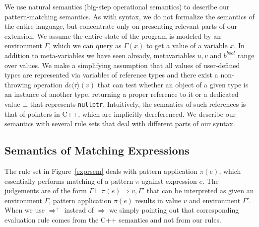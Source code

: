 \documentclass[preprint]{sigplanconf}
\makeatletter
\DeclareRobustCommand{\code}[1]{{\lstinline[breaklines=false,escapechar=@]{#1}}}
\newcommand{\evals}{\Rightarrow}
\newcommand{\evalspp}{\Rightarrow^+}
\newcommand{\DynCast}[2]{\ensuremath{dc\langle{#1}\rangle({#2})}}
\newcommand{\nullptr}{\ensuremath{\bot}}
\makeatother
\begin{document}
We use natural semantics\cite{Kahn87} (big-step operational semantics) to 
describe our pattern-matching semantics. As with syntax, we do not formalize the 
semantics of the entire language, but concentrate only on presenting relevant 
parts of our extension. We assume the entire state of the program is modeled by 
an environment $\Gamma$, which we can query as $\Gamma(x)$ to get a value of a 
variable $x$. In addition to meta-variables we have seen already, metavariables 
$u,v$ and $b^{bool}$ range over values. We make a simplifying assumption that 
all values of user-defined types are represented via variables of reference 
types and there exist a non-throwing operation \DynCast{\tau}{v} that can test 
whether an object of a given type is an instance of another type, returning a 
proper reference to it or a dedicated value \nullptr{} that represents 
\code{nullptr}. Intuitively, the semantics of such references is that of 
pointers in C++, which are implicitly dereferenced. We describe our semantics 
with several rule sets that deal with different parts of our syntax.

\subsection{Semantics of Matching Expressions}
\label{sec:semme}

The rule set in Figure~\ref{exprsem} deals with pattern application $\pi(e)$, 
which essentially performs matching of a pattern $\pi$ against expression $e$. 
The judgements are of the form $\Gamma\vdash \pi(e) \evals v,\Gamma'$ that can 
be interpreted as given an environment $\Gamma$, pattern application $\pi(e)$ 
results in value $v$ and environment $\Gamma'$. When we use $\evalspp$ instead 
of $\evals$ we simply pointing out that corresponding evaluation rule comes from 
the C++ semantics and not from our rules.
\end{document}

